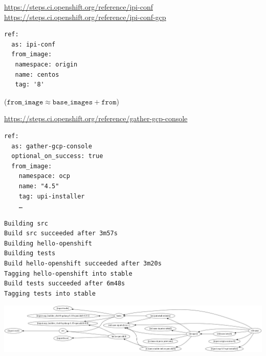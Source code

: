 \begin{frame}[fragile]
    \autotitle
    \small
    \url{https://steps.ci.openshift.org/reference/ipi-conf}
    \url{https://steps.ci.openshift.org/reference/ipi-conf-gcp}
    \normalsize
    \begin{verbatim}
ref:
  as: ipi-conf
  from_image:
   namespace: origin
   name: centos
   tag: '8'
    \end{verbatim}
    ($\texttt{from\_image} \approx \texttt{base\_images} + \texttt{from}$)
\end{frame}

\begin{frame}[fragile]
    \autotitle
    \footnotesize
    \url{https://steps.ci.openshift.org/reference/gather-gcp-console}
    \normalsize
    \begin{verbatim}
ref:
  as: gather-gcp-console
  optional_on_success: true
  from_image:
    namespace: ocp
    name: "4.5"
    tag: upi-installer
    …
    \end{verbatim}
\end{frame}

\begin{frame}[fragile]
    \autotitle
    \small
    \begin{verbatim}
Building src
Build src succeeded after 3m57s
Building hello-openshift
Building tests
Build hello-openshift succeeded after 3m20s
Tagging hello-openshift into stable
Build tests succeeded after 6m48s
Tagging tests into stable
    \end{verbatim}
\end{frame}


